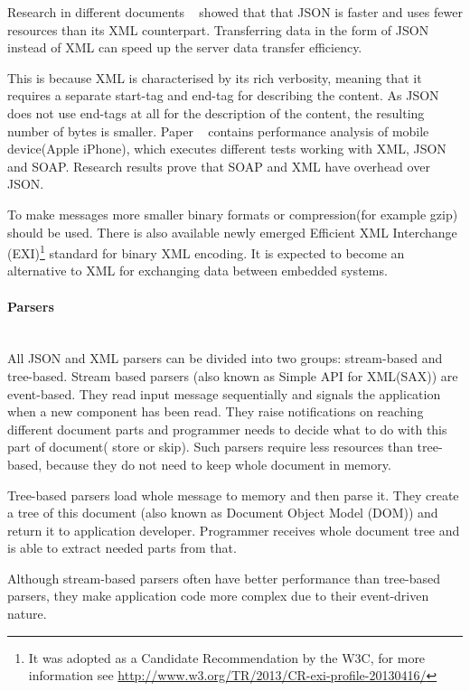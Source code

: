 Research in different documents ~\cite{5931189,NurseitovPRI09} showed that
that JSON is faster and uses fewer resources than its XML
counterpart.
Transferring data in the form of JSON instead of XML can speed up the server
data transfer efficiency.

This is because XML is characterised by its rich verbosity,
meaning that it requires a separate start-tag and end-tag for describing the content.
As JSON does not use end-tags at all for the description of the content, the
resulting number of bytes is smaller.
Paper ~\cite{5931189} contains performance analysis of mobile device(Apple
iPhone), which executes different tests working with XML, JSON and SOAP.
Research results prove that SOAP and XML have overhead over JSON.

To make messages more smaller binary formats or compression(for example gzip)  
should be used. There is also available newly emerged Efficient XML Interchange
(EXI)\footnote{It was adopted as a Candidate Recommendation by the
W3C, for more information see
\url{http://www.w3.org/TR/2013/CR-exi-profile-20130416/}} standard for binary XML encoding. It is expected to become an alternative to XML for exchanging data between embedded systems\cite{6120046}.

\paragraph{Parsers} ~\\
All JSON and XML parsers can be divided into two groups: stream-based and
tree-based. Stream based parsers (also known as Simple API for XML(SAX)) are
event-based. They read input message sequentially and signals the application when a new component has
been read. They raise notifications on reaching different document parts and
programmer needs to decide what to do with this part of document( store or
skip). Such parsers require less resources than tree-based, because they do not
need to keep whole document in memory.

Tree-based parsers load whole message to memory and then parse it. They create a
tree of this document (also known as Document Object Model (DOM)) and return it
to application developer. Programmer receives whole document tree and is able to
extract needed parts from that.

Although stream-based parsers often
have better performance than tree-based parsers, they make application code more
complex due to their event-driven nature.

